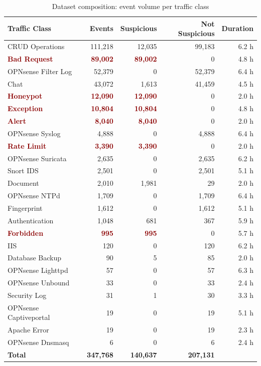 \begin{table}[hbtp]
\caption{Dataset composition: event volume per traffic class}
\label{tab:export_22Dec2025_010633_dataset}
\centering
\small
\begin{tabular}{lrrrr}
\toprule
\textbf{Traffic Class} & \textbf{Events} & \textbf{Suspicious} & \textbf{Not Suspicious} & \textbf{Duration} \\
\midrule
CRUD Operations & 111,218 & 12,035 & 99,183 & 6.2 h \\
\textcolor{darkred}{\textbf{Bad Request}} & \textcolor{darkred}{\textbf{89,002}} & \textcolor{darkred}{\textbf{89,002}} & 0 & 4.8 h \\
OPNsense Filter Log & 52,379 & 0 & 52,379 & 6.4 h \\
Chat & 43,072 & 1,613 & 41,459 & 4.5 h \\
\textcolor{darkred}{\textbf{Honeypot}} & \textcolor{darkred}{\textbf{12,090}} & \textcolor{darkred}{\textbf{12,090}} & 0 & 2.0 h \\
\textcolor{darkred}{\textbf{Exception}} & \textcolor{darkred}{\textbf{10,804}} & \textcolor{darkred}{\textbf{10,804}} & 0 & 4.8 h \\
\textcolor{darkred}{\textbf{Alert}} & \textcolor{darkred}{\textbf{8,040}} & \textcolor{darkred}{\textbf{8,040}} & 0 & 2.0 h \\
OPNsense Syslog & 4,888 & 0 & 4,888 & 6.4 h \\
\textcolor{darkred}{\textbf{Rate Limit}} & \textcolor{darkred}{\textbf{3,390}} & \textcolor{darkred}{\textbf{3,390}} & 0 & 2.0 h \\
OPNsense Suricata & 2,635 & 0 & 2,635 & 6.2 h \\
Snort IDS & 2,501 & 0 & 2,501 & 5.1 h \\
Document & 2,010 & 1,981 & 29 & 2.0 h \\
OPNsense NTPd & 1,709 & 0 & 1,709 & 6.4 h \\
Fingerprint & 1,612 & 0 & 1,612 & 5.1 h \\
Authentication & 1,048 & 681 & 367 & 5.9 h \\
\textcolor{darkred}{\textbf{Forbidden}} & \textcolor{darkred}{\textbf{995}} & \textcolor{darkred}{\textbf{995}} & 0 & 5.7 h \\
IIS & 120 & 0 & 120 & 6.2 h \\
Database Backup & 90 & 5 & 85 & 2.0 h \\
OPNsense Lighttpd & 57 & 0 & 57 & 6.3 h \\
OPNsense Unbound & 33 & 0 & 33 & 2.4 h \\
Security Log & 31 & 1 & 30 & 3.3 h \\
OPNsense Captiveportal & 19 & 0 & 19 & 5.1 h \\
Apache Error & 19 & 0 & 19 & 2.3 h \\
OPNsense Dnsmasq & 6 & 0 & 6 & 2.4 h \\
\midrule
\textbf{Total} & \textbf{347,768} & \textbf{140,637} & \textbf{207,131} & \\
\bottomrule
\end{tabular}
\end{table}